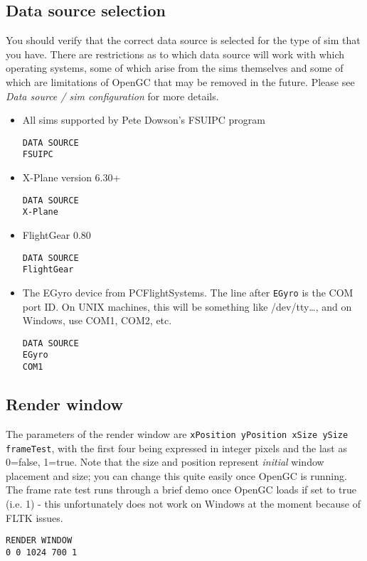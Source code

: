 \documentclass[11pt]{article}
\begin{document}
\subsection{Data source selection}

You should verify that the correct data source is selected for the type of sim that you have. There are restrictions as to which data source will work with which operating systems, some of which arise from the sims themselves and some of which are limitations of OpenGC that may be removed in the future. Please see \emph{Data source / sim configuration} for more details.

\begin{itemize}

\item All sims supported by Pete Dowson's FSUIPC program

\begin{verbatim}
DATA SOURCE
FSUIPC
\end{verbatim}

\item X-Plane version 6.30+

\begin{verbatim}
DATA SOURCE
X-Plane
\end{verbatim}

\item FlightGear 0.80

\begin{verbatim}
DATA SOURCE
FlightGear
\end{verbatim}

\item The EGyro device from PCFlightSystems. The line after \texttt{EGyro} is the COM port ID. On UNIX machines, this will be something like /dev/tty\dots, and on Windows, use COM1, COM2, etc.

\begin{verbatim}
DATA SOURCE
EGyro
COM1
\end{verbatim}

\end{itemize}

\subsection{Render window}

The parameters of the render window are \texttt{xPosition yPosition xSize ySize frameTest}, with the first four being expressed in integer pixels and the last as 0=false, 1=true. Note that the size and position represent \textit{initial} window placement and size; you can change this quite easily once OpenGC is running. The frame rate test runs through a brief demo once OpenGC loads if set to true (i.e. 1) - this unfortunately does not work on Windows at the moment because of FLTK issues.
\begin{verbatim}
RENDER WINDOW
0 0 1024 700 1
\end{verbatim}
\end{document}
